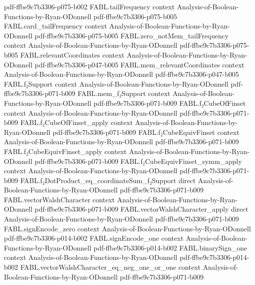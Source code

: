\begin{theorem}
  {pdf-ffbe9c7b3306-p075-b002}
\proofstep
  {FABL.tailFrequency}
  {context}
  {Analysis-of-Boolean-Functions-by-Ryan-ODonnell}
  {pdf-ffbe9c7b3306-p075-b005}
\proofstep
  {FABL.card_tailFrequency}
  {context}
  {Analysis-of-Boolean-Functions-by-Ryan-ODonnell}
  {pdf-ffbe9c7b3306-p075-b005}
\proofstep
  {FABL.zero_notMem_tailFrequency}
  {context}
  {Analysis-of-Boolean-Functions-by-Ryan-ODonnell}
  {pdf-ffbe9c7b3306-p075-b005}
\proofstep
  {FABL.relevantCoordinates}
  {context}
  {Analysis-of-Boolean-Functions-by-Ryan-ODonnell}
  {pdf-ffbe9c7b3306-p047-b005}
\proofstep
  {FABL.mem_relevantCoordinates}
  {context}
  {Analysis-of-Boolean-Functions-by-Ryan-ODonnell}
  {pdf-ffbe9c7b3306-p047-b005}
\proofstep
  {FABL.f₂Support}
  {context}
  {Analysis-of-Boolean-Functions-by-Ryan-ODonnell}
  {pdf-ffbe9c7b3306-p071-b009}
\proofstep
  {FABL.mem_f₂Support}
  {context}
  {Analysis-of-Boolean-Functions-by-Ryan-ODonnell}
  {pdf-ffbe9c7b3306-p071-b009}
\proofstep
  {FABL.f₂CubeOfFinset}
  {context}
  {Analysis-of-Boolean-Functions-by-Ryan-ODonnell}
  {pdf-ffbe9c7b3306-p071-b009}
\proofstep
  {FABL.f₂CubeOfFinset_apply}
  {context}
  {Analysis-of-Boolean-Functions-by-Ryan-ODonnell}
  {pdf-ffbe9c7b3306-p071-b009}
\proofstep
  {FABL.f₂CubeEquivFinset}
  {context}
  {Analysis-of-Boolean-Functions-by-Ryan-ODonnell}
  {pdf-ffbe9c7b3306-p071-b009}
\proofstep
  {FABL.f₂CubeEquivFinset_apply}
  {context}
  {Analysis-of-Boolean-Functions-by-Ryan-ODonnell}
  {pdf-ffbe9c7b3306-p071-b009}
\proofstep
  {FABL.f₂CubeEquivFinset_symm_apply}
  {context}
  {Analysis-of-Boolean-Functions-by-Ryan-ODonnell}
  {pdf-ffbe9c7b3306-p071-b009}
\proofstep
  {FABL.f₂DotProduct_eq_coordinateSum_f₂Support}
  {direct}
  {Analysis-of-Boolean-Functions-by-Ryan-ODonnell}
  {pdf-ffbe9c7b3306-p071-b009}
\proofstep
  {FABL.vectorWalshCharacter}
  {context}
  {Analysis-of-Boolean-Functions-by-Ryan-ODonnell}
  {pdf-ffbe9c7b3306-p071-b009}
\proofstep
  {FABL.vectorWalshCharacter_apply}
  {direct}
  {Analysis-of-Boolean-Functions-by-Ryan-ODonnell}
  {pdf-ffbe9c7b3306-p071-b009}
\proofstep
  {FABL.signEncode_zero}
  {context}
  {Analysis-of-Boolean-Functions-by-Ryan-ODonnell}
  {pdf-ffbe9c7b3306-p014-b002}
\proofstep
  {FABL.signEncode_one}
  {context}
  {Analysis-of-Boolean-Functions-by-Ryan-ODonnell}
  {pdf-ffbe9c7b3306-p014-b002}
\proofstep
  {FABL.binarySign_one}
  {context}
  {Analysis-of-Boolean-Functions-by-Ryan-ODonnell}
  {pdf-ffbe9c7b3306-p014-b002}
\proofstep
  {FABL.vectorWalshCharacter_eq_neg_one_or_one}
  {context}
  {Analysis-of-Boolean-Functions-by-Ryan-ODonnell}
  {pdf-ffbe9c7b3306-p071-b009}

\end{theorem}
